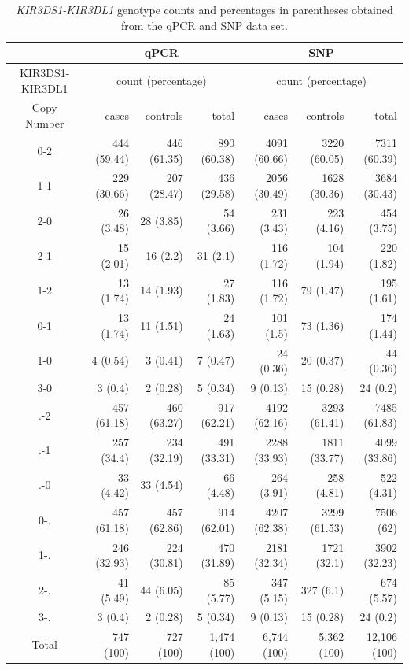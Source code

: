 \documentclass[12pt,a4paper,twoside]{article}
\begin{document}
\begin{table}[h] \footnotesize
    \centering
    \begin{tabularx}{\textwidth}{crrr|rrr}
       & \multicolumn{3}{c}{qPCR} & \multicolumn{3}{c}{SNP} \\
      \toprule
      { KIR3DS1-KIR3DL1} & \multicolumn{3}{c}{count (percentage)} & \multicolumn{3}{c}{count (percentage)} \\
          Copy Number & cases & controls & total & cases & controls & total \\ 
      \hline
      0-2 & 444 (59.44) & 446 (61.35) & 890 (60.38) & 4091 (60.66) & 3220 (60.05) & 7311 (60.39) \\ 
      1-1 & 229 (30.66) & 207 (28.47) & 436 (29.58) & 2056 (30.49) & 1628 (30.36) & 3684 (30.43) \\ 
      2-0 & 26 (3.48) & 28 (3.85) & 54 (3.66) & 231 (3.43) & 223 (4.16) & 454 (3.75) \\ 
      2-1 & 15 (2.01) & 16 (2.2) & 31 (2.1) & 116 (1.72) & 104 (1.94) & 220 (1.82) \\ 
      1-2 & 13 (1.74) & 14 (1.93) & 27 (1.83) & 116 (1.72) & 79 (1.47) & 195 (1.61) \\ 
      0-1 & 13 (1.74) & 11 (1.51) & 24 (1.63) & 101 (1.5) & 73 (1.36) & 174 (1.44) \\ 
      1-0 & 4 (0.54) & 3 (0.41) & 7 (0.47) & 24 (0.36) & 20 (0.37) & 44 (0.36) \\ 
      3-0 & 3 (0.4) & 2 (0.28) & 5 (0.34) & 9 (0.13) & 15 (0.28) & 24 (0.2) \\ 
      \midrule
      .-2 & 457 (61.18) & 460 (63.27) & 917 (62.21) & 4192 (62.16) & 3293 (61.41) & 7485 (61.83) \\ 
      .-1 & 257 (34.4) & 234 (32.19) & 491 (33.31) & 2288 (33.93) & 1811 (33.77) & 4099 (33.86) \\ 
      .-0 & 33 (4.42) & 33 (4.54) & 66 (4.48) & 264 (3.91) & 258 (4.81) & 522 (4.31) \\ 
      \midrule
      0-. & 457 (61.18) & 457 (62.86) & 914 (62.01) & 4207 (62.38) & 3299 (61.53) & 7506 (62) \\ 
      1-. & 246 (32.93) & 224 (30.81) & 470 (31.89) & 2181 (32.34) & 1721 (32.1) & 3902 (32.23) \\ 
      2-. & 41 (5.49) & 44 (6.05) & 85 (5.77) & 347 (5.15) & 327 (6.1) & 674 (5.57) \\ 
      3-. & 3 (0.4) & 2 (0.28) & 5 (0.34) & 9 (0.13) & 15 (0.28) & 24 (0.2) \\ 
      \midrule
      Total &  747 (100) & 727 (100) & 1,474 (100) & 6,744 (100) & 5,362 (100) &  12,106 (100)\\ 
    \end{tabularx}
    \caption{ \emph{KIR3DS1-KIR3DL1} genotype counts and percentages in parentheses obtained from the qPCR and SNP data set. }
    \label{table:snp-count}
\end{table}
\end{document}
